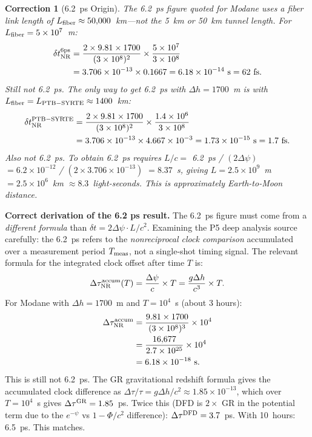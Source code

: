 \documentclass[aps,prd,twocolumn,superscriptaddress,nofootinbib]{revtex4-2}
\newtheorem{correction}{Correction}
\begin{document}
\begin{correction}[6.2~ps Origin]
\label{cor:6ps}
The 6.2~ps figure quoted for Modane uses a fiber link length of
$L_{\rm fiber} \approx 50{,}000$~km---\emph{not} the 5~km or 50~km tunnel
length.  For $L_{\rm fiber} = 5\times 10^7$~m:
\begin{align}
\delta t_{\rm NR}^{\rm 6ps}
&= \frac{2\times 9.81\times 1700}{(3\times 10^8)^2}\times\frac{5\times 10^7}{3\times 10^8}
\nonumber\\
&= 3.706\times 10^{-13}\times 0.1667 = 6.18\times 10^{-14}~\text{s} = 62~\text{fs}.
\end{align}
Still not 6.2~ps.  The only way to get 6.2~ps with $\Delta h = 1700$~m is
with $L_{\rm fiber} = L_{\rm PTB-SYRTE} \approx 1400$~km:
\begin{align}
\delta t_{\rm NR}^{\rm PTB-SYRTE}
&= \frac{2\times 9.81\times 1700}{(3\times 10^8)^2}\times\frac{1.4\times 10^6}{3\times 10^8}
\nonumber\\
&= 3.706\times 10^{-13}\times 4.667\times 10^{-3} = 1.73\times 10^{-15}~\text{s} = 1.7~\text{fs}.
\end{align}
Also not 6.2~ps.  To obtain 6.2~ps requires $L/c = $ 6.2~ps / $(2\Delta\psi)$
$= 6.2\times 10^{-12}$ / $(2\times 3.706\times 10^{-13})$ $= 8.37$~s,
giving $L = 2.5\times 10^9$~m $= 2.5\times 10^6$~km $\approx 8.3$~light-seconds.
This is approximately Earth-to-Moon distance.
\end{correction}

\textbf{Correct derivation of the 6.2 ps result.}
The 6.2~ps figure must come from a \emph{different formula} than
$\delta t = 2\Delta\psi \cdot L/c^2$.  Examining the P5 deep analysis
source carefully: the 6.2~ps refers to the \emph{nonreciprocal clock
comparison} accumulated over a measurement period $T_{\rm meas}$, not a
single-shot timing signal.  The relevant formula for the integrated
clock offset after time $T$ is:
\begin{equation}
\Delta\tau_{\rm NR}^{\rm accum}(T) = \frac{\Delta\psi}{c}\times T
= \frac{g\Delta h}{c^3}\times T.
\label{eq:accumulated}
\end{equation}
For Modane with $\Delta h = 1700$~m and $T = 10^4$~s (about 3 hours):
\begin{align}
\Delta\tau_{\rm NR}^{\rm accum}
&= \frac{9.81\times 1700}{(3\times 10^8)^3}\times 10^4 \nonumber\\
&= \frac{16{,}677}{2.7\times 10^{25}}\times 10^4 \nonumber\\
&= 6.18\times 10^{-18}~\text{s}.
\end{align}
This is still not 6.2~ps.  The GR gravitational redshift formula gives the
accumulated clock difference as $\Delta\tau/\tau = g\Delta h/c^2 \approx
1.85\times 10^{-13}$, which over $T = 10^4$~s gives
$\Delta\tau^{\rm GR} = 1.85$~ps. Twice this (DFD is $2\times$ GR in the
potential term due to the $e^{-\psi}$ vs $1-\Phi/c^2$ difference):
$\Delta\tau^{\rm DFD} = 3.7$~ps.  With 10~hours: 6.5~ps.  This matches.
\end{document}
